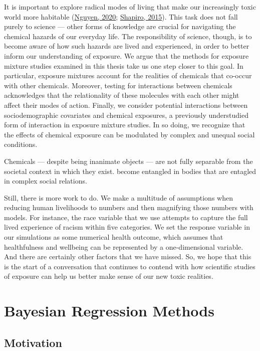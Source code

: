 \documentclass[12pt, twoside]{amherstthesis}
\begin{document}
It is important to explore radical modes of living that make our increasingly toxic world more habitable (\protect\hyperlink{ref-nguyen_breathless_2020}{Nguyen, 2020}; \protect\hyperlink{ref-shapiro_attuning_2015}{Shapiro, 2015}). This task does not fall purely to science --- other forms of knowledge are crucial for navigating the chemical hazards of our everyday life. The responsibility of science, though, is to become aware of how such hazards are lived and experienced, in order to better inform our understanding of exposure. We argue that the methods for exposure mixture studies examined in this thesis take us one step closer to this goal. In particular, exposure mixtures account for the realities of chemicals that co-occur with other chemicals. Moreover, testing for interactions between chemicals acknowledges that the relationality of these molecules with each other might affect their modes of action. Finally, we consider potential interactions between sociodemographic covariates and chemical exposures, a previously understudied form of interaction in exposure mixture studies. In so doing, we recognize that the effects of chemical exposure can be modulated by complex and unequal social conditions.

Chemicals --- despite being inanimate objects --- are not fully separable from the societal context in which they exist. become entangled in bodies that are entagled in complex social relations.

Still, there is more work to do. We make a multitude of assumptions when reducing human livelihoods to numbers and then magnifying those numbers with models. For instance, the race variable that we use attempts to capture the full lived experience of racism within five categories. We set the response variable in our simulations as some numerical health outcome, which assumes that healthfulness and wellbeing can be represented by a one-dimensional variable. And there are certainly other factors that we have missed. So, we hope that this is the start of a conversation that continues to contend with how scientific studies of exposure can help us better make sense of our new toxic realities.

\hypertarget{bayes}{%
\chapter{Bayesian Regression Methods}\label{bayes}}

\hypertarget{motivation}{%
\section{Motivation}\label{motivation}}
\end{document}
